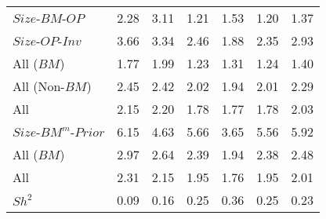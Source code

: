 \begin{table}[!ht]
\begin{tabular}{lrrrrrr}
    $Size$-$BM$-$OP$  & 2.28  & 3.11  & 1.21  & 1.53  & 1.20  & 1.37  \\
  
    $Size$-$OP$-$Inv$  & 3.66  & 3.34  & 2.46  & 1.88  & 2.35  & 2.93  \\
  [1em]
    All ($BM$)  & 1.77  & 1.99  & 1.23  & 1.31  & 1.24  & 1.40  \\
  
    All (Non-$BM$)  & 2.45  & 2.42  & 2.02  & 1.94  & 2.01  & 2.29  \\
  
    All  & 2.15  & 2.20  & 1.78  & 1.77  & 1.78  & 2.03  \\
  [1em]
    $Size$-$BM^m$-$Prior$  & 6.15  & 4.63  & 5.66  & 3.65  & 5.56  & 5.92  \\
  [1em]
    All ($BM$)  & 2.97  & 2.64  & 2.39  & 1.94  & 2.38  & 2.48  \\
  
    All  & 2.31  & 2.15  & 1.95  & 1.76  & 1.95  & 2.01  \\
  [1em]
    $Sh^2$  & 0.09  & 0.16  & 0.25  & 0.36  & 0.25  & 0.23  \\
  
  \bottomrule
\end{tabular}
\label{tbl:GRS}
\end{table}